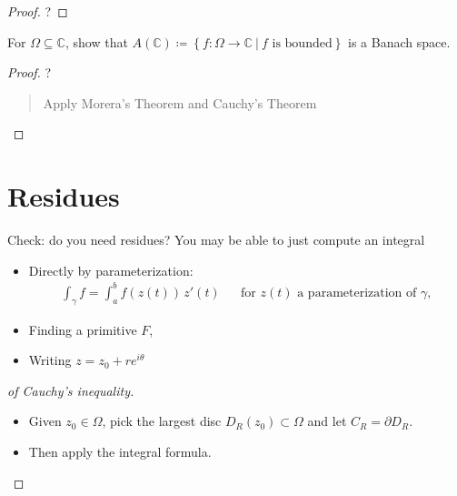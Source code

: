 \begin{proof}

?

\end{proof}

\begin{proposition}

For \(\Omega\subseteq{\mathbb{C}}\), show that
\(A({\mathbb{C}})\coloneqq\left\{{f: \Omega \to {\mathbb{C}}{~\mathrel{\Big|}~}f\text{ is bounded}}\right\}\)
is a Banach space.

\end{proposition}

\begin{proof}

?

\begin{quote}
Apply Morera's Theorem and Cauchy's Theorem
\end{quote}

\end{proof}

\hypertarget{residues}{%
\section{Residues}\label{residues}}

\begin{remark}

Check: do you need residues? You may be able to just compute an integral

\begin{itemize}
\item
  Directly by parameterization:
  \begin{align*}
  \int_\gamma f = \int_a^b f(z(t))\, z'(t) && \text{for } z(t) \text{ a parameterization of } \gamma
  ,\end{align*}
\item
  Finding a primitive \(F\),
\item
  Writing \(z= z_0 + re^{i \theta }\)
\end{itemize}

\end{remark}

\begin{proof}[of Cauchy's inequality]

\envlist

\begin{itemize}
\tightlist
\item
  Given \(z_0\in \Omega\), pick the largest disc
  \(D_R(z_0) \subset \Omega\) and let \(C_R = {{\partial}}D_R\).
\item
  Then apply the integral formula.
\end{itemize}

\end{proof}

